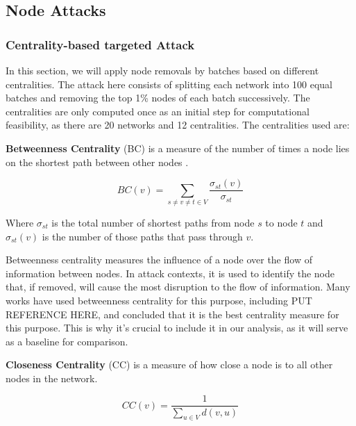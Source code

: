 \subsection{Node Attacks}\label{node_attacks}

\subsubsection{Centrality-based targeted Attack}\label{cent_attack}

In this section, we will apply node removals by batches based on different centralities. 
The attack here consists of splitting each network into 100 equal batches and removing the top 1\% nodes of each batch successively.
The centralities are only computed once as an initial step for computational feasibility, as there are 20 networks and 12 centralities.  
The centralities used are:

\newline

\textbf{Betweenness Centrality} (BC) is a measure of the number of times a node lies on the shortest path between other nodes \cite{betweeness}.

\begin{equation}
    BC(v) = \sum_{s \neq v \neq t \in V} \frac{\sigma_{st}(v)}{\sigma_{st}}
\end{equation}

Where $\sigma_{st}$ is the total number of shortest paths from node $s$ to node $t$ 
and $\sigma_{st}(v)$ is the number of those paths that pass through $v$.

Betweenness centrality measures the influence of a node over the flow of information between nodes. 
In attack contexts, it is used to identify the node that, if removed, will cause the most disruption to the flow of information.
Many works have used betweenness centrality for this purpose, including PUT REFERENCE HERE, 
and concluded that it is the best centrality measure for this purpose.
This is why it's crucial to include it in our analysis, as it will serve as a baseline for comparison.

\newline

\textbf{Closeness Centrality} (CC) is a measure of how close a node is to all other nodes in the network.

\begin{equation}
    CC(v) = \frac{1}{\sum_{u \in V} d(v,u)}
\end{equation}

